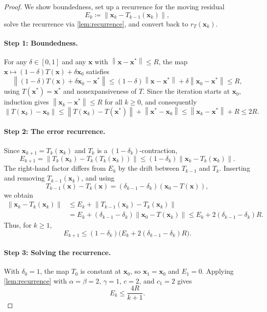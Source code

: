\documentclass[letterpaper,11pt]{article}
\newcommand{\norm}[1]{\left\| #1 \right\|}
\newcommand{\vect}[1]{\mathbf{#1}}
\begin{document}
\begin{proof}
We show boundedness, set up a recurrence for the moving residual
\[
    E_k\coloneqq\norm{\vect{x}_k-T_{k-1}(\vect{x}_k)},
\]
solve the recurrence via \cref{lem:recurrence}, and convert back to
\(r_T(\vect{x}_k)\).

\paragraph{Step 1: Boundedness.}
For any \(\delta\in[0,1]\) and any \(\vect{x}\) with
\(\norm{\vect{x}-\vect{x}^*}\le R\), the map
\(\vect{x}\mapsto(1-\delta)T(\vect{x})+\delta\vect{x}_0\) satisfies
\[
    \norm{(1-\delta)T(\vect{x})+\delta\vect{x}_0-\vect{x}^*}
    \le
    (1-\delta)\norm{\vect{x}-\vect{x}^*}
    +\delta\norm{\vect{x}_0-\vect{x}^*}
    \le R,
\]
using \(T(\vect{x}^*)=\vect{x}^*\) and nonexpansiveness of \(T\). Since the
iteration starts at \(\vect{x}_0\), induction gives
\(\norm{\vect{x}_k-\vect{x}^*}\le R\) for all \(k\ge0\), and consequently
\[
    \norm{T(\vect{x}_k)-\vect{x}_0}
    \le
    \norm{T(\vect{x}_k)-T(\vect{x}^*)}
    +\norm{\vect{x}^*-\vect{x}_0}
    \le
    \norm{\vect{x}_k-\vect{x}^*}+R
    \le 2R.
\]

\paragraph{Step 2: The error recurrence.}
Since \(\vect{x}_{k+1}=T_k(\vect{x}_k)\) and \(T_k\) is a
\((1-\delta_k)\)-contraction,
\[
    E_{k+1}
    =
    \norm{T_k(\vect{x}_k)-T_k(T_k(\vect{x}_k))}
    \le
    (1-\delta_k)\norm{\vect{x}_k-T_k(\vect{x}_k)}.
\]
The right-hand factor differs from \(E_k\) by the drift between
\(T_{k-1}\) and \(T_k\). Inserting and removing \(T_{k-1}(\vect{x}_k)\), and
using
\[
    T_{k-1}(\vect{x})-T_k(\vect{x})
    =
    (\delta_{k-1}-\delta_k)(\vect{x}_0-T(\vect{x})),
\]
we obtain
\begin{align*}
    \norm{\vect{x}_k-T_k(\vect{x}_k)}
    &\le
    E_k+\norm{T_{k-1}(\vect{x}_k)-T_k(\vect{x}_k)} \\
    &=
    E_k+(\delta_{k-1}-\delta_k)\norm{\vect{x}_0-T(\vect{x}_k)}
    \le
    E_k+2(\delta_{k-1}-\delta_k)R.
\end{align*}
Thus, for \(k\ge1\),
\begin{equation}\label{eq:error_recurrence}
    E_{k+1}
    \le
    (1-\delta_k)\bigl(E_k+2(\delta_{k-1}-\delta_k)R\bigr).
\end{equation}

\paragraph{Step 3: Solving the recurrence.}
With \(\delta_0=1\), the map \(T_0\) is constant at \(\vect{x}_0\), so
\(\vect{x}_1=\vect{x}_0\) and \(E_1=0\). Applying \cref{lem:recurrence} with
\(\alpha=\beta=2\), \(\gamma=1\), \(c=2\), and \(c_1=2\) gives
\[
    E_k\le\frac{4R}{k+1}.
\]


\end{proof}
\end{document}
